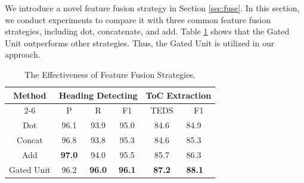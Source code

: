 \documentclass[a4paper,conference]{IEEEtran}
\begin{document}
We introduce a novel feature fusion strategy in Section \ref{sec:fuse}. In this section, we conduct experiments to compare it with three common feature fusion strategies, including dot, concatenate, and add. Table \ref{tabel:fuse} shows that the Gated Unit outperforms other strategies. Thus, the Gated Unit is utilized in our approach.


\begin{table}[]
\caption{The Effectiveness of Feature Fusion Strategies.}
\label{tabel:fuse}
\centering
\begin{tabular}{c|ccc|cl}
\hline
\multirow{2}{*}{Method} & \multicolumn{3}{c|}{Heading Detecting} & \multicolumn{2}{c}{ToC Extraction} \\ \cline{2-6} 
 & \multicolumn{1}{c|}{P} & \multicolumn{1}{c|}{R} & F1 & \multicolumn{1}{c|}{TEDS} & \multicolumn{1}{c}{F1} \\ \hline
Dot & \multicolumn{1}{c|}{96.1} & \multicolumn{1}{c|}{93.9} & 95.0 & \multicolumn{1}{c|}{84.6} & 84.9 \\
Concat & \multicolumn{1}{c|}{96.8} & \multicolumn{1}{c|}{93.8} & 95.3 & \multicolumn{1}{c|}{84.6} & 85.3 \\
Add & \multicolumn{1}{c|}{\textbf{97.0}} & \multicolumn{1}{c|}{94.0} & 95.5 & \multicolumn{1}{c|}{85.7} & 86.3 \\ \hline
Gated Unit & \multicolumn{1}{c|}{96.2} & \multicolumn{1}{c|}{\textbf{96.0}} & \textbf{96.1} & \multicolumn{1}{c|}{\textbf{87.2}} & \textbf{88.1} \\ \hline
\end{tabular}
\end{table}
\end{document}
